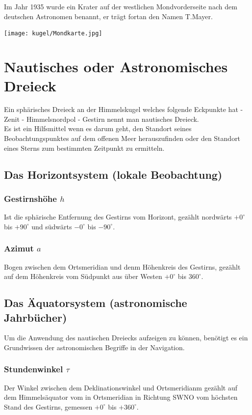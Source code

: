 \begin{refsection}
Im Jahr 1935 wurde ein Krater auf der westlichen Mondvorderseite nach dem deutschen Astronomen benannt, er trägt fortan den Namen T.Mayer.

\begin{center}
        \texttt{[image: kugel/Mondkarte.jpg]}
\end{center}


\section{Nautisches oder Astronomisches Dreieck}
Ein sphärisches Dreieck an der Himmelskugel welches folgende Eckpunkte hat
- Zenit
- Himmelsnordpol
- Gestirn
nennt man nautisches Dreieck.\\

Es ist ein Hilfsmittel wenn es darum geht, den Standort seines Beobachtungspunktes auf dem offenen Meer herauszufinden oder den Standort eines Sterns zum bestimmten Zeitpunkt zu ermitteln.

\subsection{Das Horizontsystem (lokale Beobachtung)}


\subsubsection{Gestirnshöhe $h$}
Ist die sphärische Entfernung des Gestirns vom Horizont, gezählt nordwärts $+0^{\circ}$ bis $+90^{\circ}$ und südwärts $-0^{\circ}$ bis $-90^{\circ}$.

\subsubsection{Azimut $a$}
Bogen zwischen dem Ortsmeridian und denm Höhenkreis des Gestirns, gezählt auf dem Höhenkreis vom Südpunkt aus über Westen $+0^{\circ}$ bis $360^{\circ}$.



\subsection{Das Äquatorsystem (astronomische Jahrbücher)}


Um die Anwendung des nautischen Dreiecks aufzeigen zu können, benötigt es ein Grundwissen der astronomischen Begriffe in der Navigation.


\subsubsection{Stundenwinkel $\tau$}
Der Winkel zwischen dem Deklinationswinkel und Ortsmeridianm gezählt auf dem Himmelsäquator vom in Ortsmeridian in Richtung SWNO vom höchsten Stand des Gestirns, gemessen $+0^{\circ}$ bis $+360^{\circ}$.



\end{refsection}
